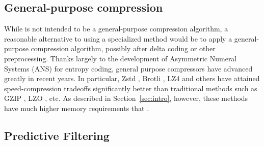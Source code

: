 

\subsection{General-purpose compression}
While \minesp is not intended to be a general-purpose compression algorithm, a reasonable alternative to using a specialized method would be to apply a general-purpose compression algorithm, possibly after delta coding or other preprocessing. Thanks largely to the development of Asymmetric Numeral Systems (ANS) \cite{ans} for entropy coding, general purpose compressors have advanced greatly in recent years. In particular, Zstd \cite{zstd}, Brotli \cite{brotli}, LZ4 \cite{lz4} and others have attained speed-compression tradeoffs significantly better than traditional methods such as GZIP \cite{gzip}, LZO \cite{lzo}, etc. As described in Section~\ref{sec:intro}, however, these methods have much higher memory requirements that \mine.


\subsection{Predictive Filtering}



